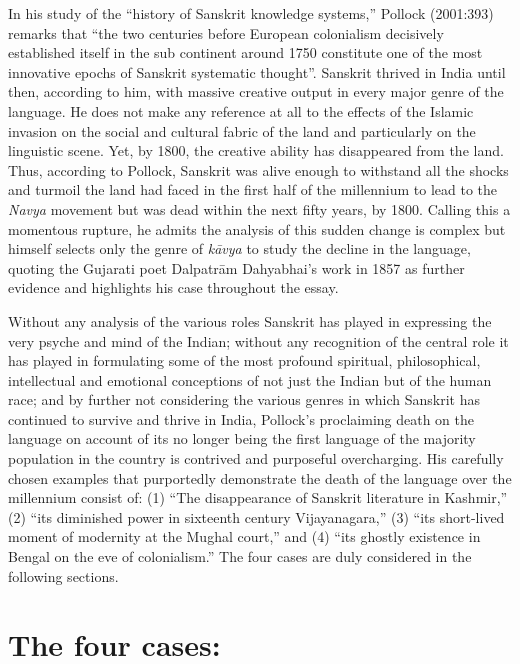 In his study of the “history of Sanskrit knowledge systems,” Pollock (2001:393) remarks that “the two centuries before European colonialism decisively established itself in the sub continent around 1750 constitute one of the most innovative epochs of Sanskrit systematic thought”. Sanskrit thrived in India until then, according to him, with massive creative output in every major genre of the language. He does not make any reference at all to the effects of the Islamic invasion on the social and cultural fabric of the land and particularly on the linguistic scene. Yet, by 1800, the creative ability has disappeared from the land. Thus, according to Pollock, Sanskrit was alive enough to withstand all the shocks and turmoil the land had faced in the first half of the millennium to lead to the {\sl Navya} movement but was dead within the next fifty years, by 1800. Calling this a momentous rupture, he admits the analysis of this sudden change is complex but himself selects only the genre of {\sl kāvya} to study the decline in the language, quoting the Gujarati poet Dalpatrām Dahyabhai’s work in 1857 as further evidence and  highlights his case throughout the essay.

Without any analysis of the various roles Sanskrit has played in expressing the very psyche and mind of the Indian; without any recognition of the central role it has played in formulating some of the most profound spiritual, philosophical, intellectual and emotional conceptions of not just the Indian but of the human race; and by further not considering the various genres in which Sanskrit has continued to survive and thrive in India, Pollock’s proclaiming death on the language on account of its no longer being the first language of the majority population in the country is contrived and purposeful overcharging. His carefully chosen examples that purportedly demonstrate the death of the language over the millennium consist of: (1) “The disappearance of Sanskrit literature in Kashmir,” (2) “its diminished power in sixteenth century Vijayanagara,” (3) “its short-lived moment of modernity at the Mughal court,” and (4) “its ghostly existence in Bengal on the eve of colonialism.” The four cases are duly considered in the following sections.

\section*{The four cases:}

